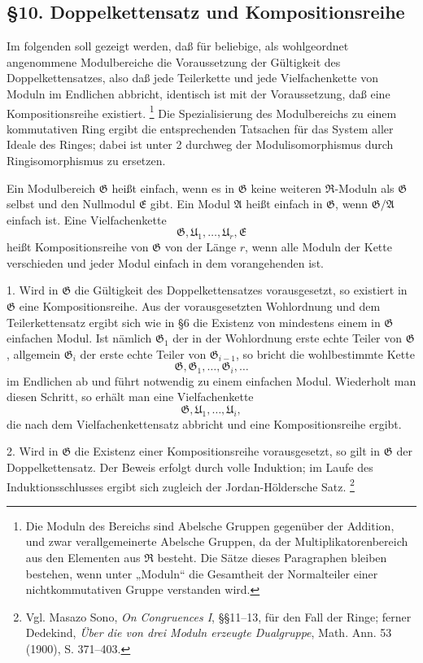 \documentclass[11pt]{article}
\providecommand{\mR}{\mathfrak{R}}
\providecommand{\mA}{\mathfrak{A}}
\providecommand{\mE}{\mathfrak{E}}
\providecommand{\mG}{\mathfrak{G}}
\providecommand{\mU}{\mathfrak{U}}
\begin{document}
\subsection*{§10. Doppelkettensatz und Kompositionsreihe}

Im folgenden soll gezeigt werden, daß für beliebige, als wohlgeordnet angenommene Modulbereiche die Voraussetzung der Gültigkeit des Doppelkettensatzes, also daß jede Teilerkette und jede Vielfachenkette von Moduln im Endlichen abbricht, identisch ist mit der Voraussetzung, daß eine Kompositionsreihe existiert.
\footnote{Die Moduln des Bereichs sind Abelsche Gruppen gegenüber der Addition, und zwar verallgemeinerte Abelsche Gruppen, da der Multiplikatorenbereich aus den Elementen aus $\mR$ besteht. Die Sätze dieses Paragraphen bleiben bestehen, wenn unter „Moduln“ die Gesamtheit der Normalteiler einer nichtkommutativen Gruppe verstanden wird.}
Die Spezialisierung des Modulbereichs zu einem kommutativen Ring ergibt die entsprechenden Tatsachen für das System aller Ideale des Ringes; dabei ist unter 2 durchweg der Modulisomorphismus durch Ringisomorphismus zu ersetzen.

Ein Modulbereich $\mG$ heißt einfach, wenn es in $\mG$ keine weiteren $\mR$-Moduln als $\mG$ selbst und den Nullmodul $\mE$ gibt. Ein Modul $\mA$ heißt einfach in $\mG$, wenn $\mG/\mA$ einfach ist. Eine Vielfachenkette
\[
        \mG,\mU_1,\ldots,\mU_r,\mE
\]
heißt Kompositionsreihe von $\mG$ von der Länge $r$, wenn alle Moduln der Kette verschieden und jeder Modul einfach in dem vorangehenden ist.

1. Wird in $\mG$ die Gültigkeit des Doppelkettensatzes vorausgesetzt, so existiert in $\mG$ eine Kompositionsreihe. Aus der vorausgesetzten Wohlordnung und dem Teilerkettensatz ergibt sich wie in §6 die Existenz von mindestens einem in $\mG$ einfachen Modul. Ist nämlich $\mG_1$ der in der Wohlordnung erste echte Teiler von $\mG$, allgemein $\mG_i$ der erste echte Teiler von $\mG_{i-1}$, so bricht die wohlbestimmte Kette
\[
        \mG,\mG_1,\ldots,\mG_i,\ldots
\]
im Endlichen ab und führt notwendig zu einem einfachen Modul. Wiederholt man diesen Schritt, so erhält man eine Vielfachenkette
\[
        \mG,\mU_1,\ldots,\mU_i,
\]
die nach dem Vielfachenkettensatz abbricht und eine Kompositionsreihe ergibt.

2. Wird in $\mG$ die Existenz einer Kompositionsreihe vorausgesetzt, so gilt in $\mG$ der Doppelkettensatz. Der Beweis erfolgt durch volle Induktion; im Laufe des Induktionsschlusses ergibt sich zugleich der Jordan-Höldersche Satz.
\footnote{Vgl. Masazo Sono, \emph{On Congruences I}, §§11--13, für den Fall der Ringe; ferner Dedekind, \emph{Über die von drei Moduln erzeugte Dualgruppe}, Math. Ann. 53 (1900), S. 371--403.}
\end{document}
